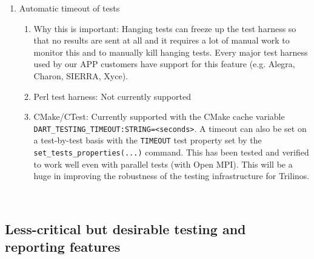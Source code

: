 \documentclass[pdf,ps2pdf,11pt]{SANDreport}
\begin{document}
\begin{enumerate}
{}\item Automatic timeout of tests

  \begin{enumerate}

  {}\item Why this is important: Hanging tests can freeze up the test
  harness so that no results are sent at all and it requires a lot of
  manual work to monitor this and to manually kill hanging tests.
  Every major test harness used by our APP customers have support for
  this feature (e.g. Alegra, Charon, SIERRA, Xyce).

  {}\item Perl test harness: Not currently supported

  {}\item CMake/CTest: Currently supported with the CMake cache
  variable {}\texttt{DART\_TESTING\_TIMEOUT:STRING=<seconds>}.  A
  timeout can also be set on a test-by-test basis with the
  {}\texttt{TIMEOUT} test property set by the
  {}\texttt{set\_tests\_properties(...)} command.  This has been
  tested and verified to work well even with parallel tests (with Open
  MPI).  This will be a huge in improving the robustness of the
  testing infrastructure for Trilinos.

  \end{enumerate}

\end{enumerate}

\
%
{}\subsection{Less-critical but desirable testing and reporting features}
%
\end{document}
